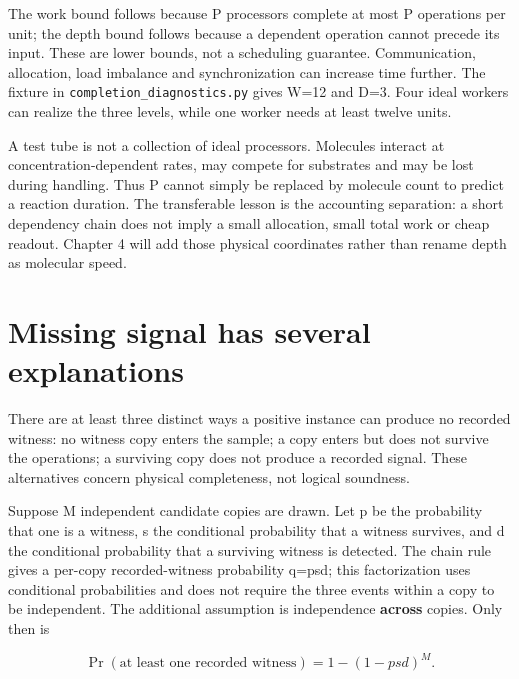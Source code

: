 The work bound follows because P processors complete at most P
operations per unit; the depth bound follows because a dependent
operation cannot precede its input. These are lower bounds, not a
scheduling guarantee. Communication, allocation, load imbalance and
synchronization can increase time further. The fixture in
\texttt{completion\_diagnostics.py} gives W=12 and D=3. Four ideal
workers can realize the three levels, while one worker needs at least
twelve units.

A test tube is not a collection of ideal processors. Molecules interact
at concentration-dependent rates, may compete for substrates and may be
lost during handling. Thus P cannot simply be replaced by molecule count
to predict a reaction duration. The transferable lesson is the
accounting separation: a short dependency chain does not imply a small
allocation, small total work or cheap readout. Chapter 4 will add those
physical coordinates rather than rename depth as molecular speed.

\section{Missing signal has several
explanations}\label{missing-signal-has-several-explanations}

There are at least three distinct ways a positive instance can produce
no recorded witness: no witness copy enters the sample; a copy enters
but does not survive the operations; a surviving copy does not produce a
recorded signal. These alternatives concern physical completeness, not
logical soundness.


Suppose M independent candidate copies are drawn. Let p be the
probability that one is a witness, s the conditional probability that a
witness survives, and d the conditional probability that a surviving
witness is detected. The chain rule gives a per-copy recorded-witness
probability q=psd; this factorization uses conditional probabilities and
does not require the three events within a copy to be independent. The
additional assumption is independence \textbf{across} copies. Only then
is

\begin{equation}
\Pr(\text{at least one recorded witness})=1-(1-psd)^M.
\end{equation}

